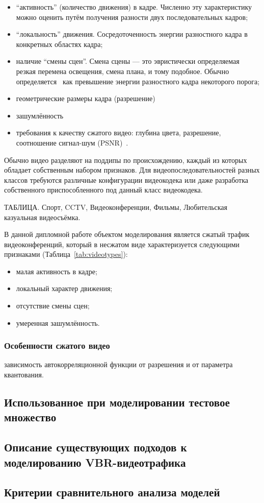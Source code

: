 \begin{itemize}
    \item ``активность'' (количество движения) в кадре. Численно 
        эту характеристику можно оценить путём получения разности
        двух последовательных кадров;
    \item ``локальность'' движения. Сосредоточенность энергии
        разностного кадра в конкретных областях кадра;
    \item наличие ``смены сцен''. Смена сцены --- это эвристически
        определяемая резкая перемена освещения, смена плана,
        и тому подобное. Обычно определяется~\cite{} как превышение
        энергии разностного кадра некоторого порога;
    \item геометрические размеры кадра (разрешение)
    \item зашумлённость
    \item требования к качеству сжатого видео: глубина цвета,
        разрешение, соотношение сигнал-шум (PSNR)~\cite{}.
\end{itemize}

Обычно видео разделяют на поддипы по происхождению,
каждый из которых обладает собственным набором признаков.
Для видеопоследовательностей разных классов требуются
различные конфигурации видеокодека или даже разработка
собственного приспособленного под данный класс видеокодека.

ТАБЛИЦА. Спорт, CCTV, Видеоконференции, Фильмы, Любительская
казуальная видеосъёмка.

В данной дипломной работе объектом моделирования является
сжатый трафик видеоконференций, который в несжатом виде
характеризуется следующими признаками (Таблица~\ref{tab:videotypes}):

\begin{itemize}
    \item малая активность в кадре;
    \item локальный характер движения;
    \item отсутствие смены сцен;
    \item умеренная зашумлённость.
\end{itemize}



\subsubsection{Особенности сжатого видео}
\hspace{3pt}

зависимость автокорреляционной функции от разрешения
и от параметра квантования.

\subsection{Использованное при моделировании тестовое множество}

\subsection{Описание существующих подходов к моделированию VBR-видеотрафика}

\subsection{Критерии сравнительного анализа моделей}
